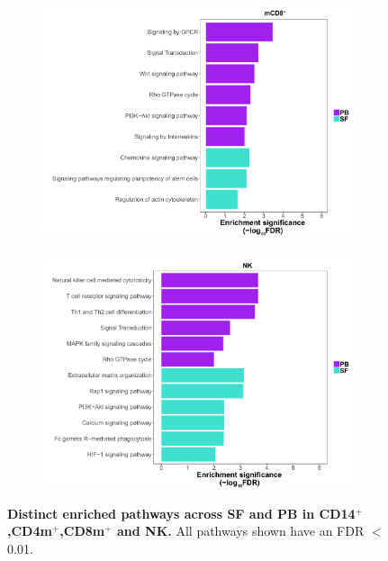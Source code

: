\begin{figure}[H]
\begin{subfigure}[b]{0.45\textwidth}
\caption{}
\end{subfigure}
~
\begin{subfigure}[b]{0.45\textwidth} 
\centering
\includegraphics[width=\textwidth]{./Results3/pdfs/ATAC_PSA_CD8_pathways_barplot_all_DOCS_proximity}%
\caption{}
\end{subfigure}
\begin{subfigure}[b]{0.45\textwidth} 
\centering
\includegraphics[width=\textwidth]{./Results3/pdfs/ATAC_PSA_NK_pathways_barplot_all_DOCS_proximity}%
\caption{}
\end{subfigure}
\caption[Distinct enriched pathways across SF and PB in CD14$^+$,CD4m$^+$,CD8m$^+$ and NK.]{\textbf{Distinct enriched pathways across SF and PB in CD14$^+$,CD4m$^+$,CD8m$^+$ and NK.} All pathways shown have an FDR $<$0.01. }
\label{figure:PSA_ATAC_pathway_analysis_all_DOC}
\end{figure}




